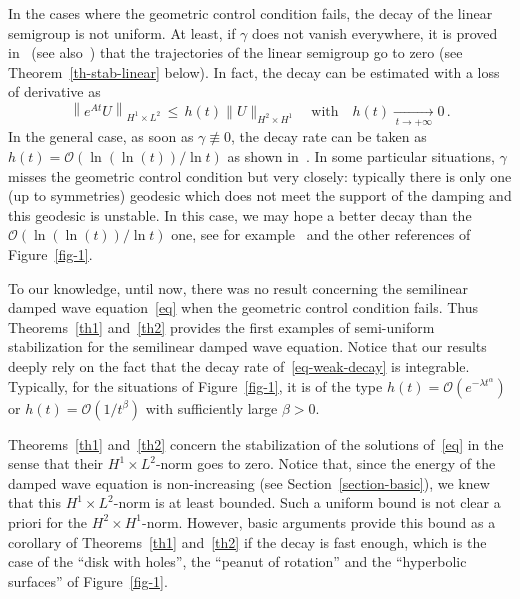 \documentclass[10pt]{amsart}
\theoremstyle{definition}\newtheorem{defi}[theo]{Definition}\newtheorem{rema}[theo]{Remark}\newtheorem{exam}[theo]{Example}\newtheorem{exem}[theo]{Example}\newtheorem{nota}[theo]{Notation}
\newcommand{\Oc}{\mathcal{O}}
\begin{document}
In the cases where the geometric control condition fails, the decay of the linear semigroup is not uniform. At least, if $\gamma$ does not vanish everywhere, it is proved in~\cite{Dafermos} (see also~\cite{Haraux}) that the trajectories of the linear semigroup go to zero (see Theorem~\ref{th-stab-linear} below). In fact, the decay can be estimated with a loss of derivative as
\begin{equation}\label{eq-weak-decay}
\left\|e^{At}U\right\|_{H^1\times L^2}\,\leq\, h(t)
\|U\|_{H^2\times H^1}\quad\text{with}\quad h(t)\xrightarrow[\,t\rightarrow +\infty\,]{} 0\,.
\end{equation}
In the general case, as soon as $\gamma\not\equiv 0$, the decay rate can be taken as\linebreak$h(t)=\Oc(\ln(\ln(t))/\ln t)$ as shown in~\cite{Lebeau,Lebeau-Robbiano}. In some particular situations, $\gamma$ misses the geometric control condition but very closely: typically there is only one (up to symmetries) geodesic which does not meet the support of the damping and this geodesic is unstable. In this case, we may hope a better decay than the $\Oc(\ln(\ln(t))/\ln t)$ one, see for example~\cite{CSVW,Leautaud-Lerner} and the other references of Figure~\ref{fig-1}.

To our knowledge, until now, there was no result concerning the semilinear damped wave equation~\eqref{eq} when the geometric control condition fails. Thus Theorems~\ref{th1} and~\ref{th2} provides the first examples of semi-uniform stabilization for the semilinear damped wave equation. Notice that our results deeply rely on the fact that the decay rate of~\eqref{eq-weak-decay} is integrable. Typically, for the situations of Figure~\ref{fig-1}, it is of the type $h(t)=\Oc(e^{-\lambda t^\alpha})$ or $h(t)=\Oc(1/t^\beta)$ with sufficiently large $\beta>0$.


Theorems~\ref{th1} and~\ref{th2} concern the stabilization of the solutions of~\eqref{eq} in the sense that their $H^1\times L^2$-norm goes to zero. Notice that, since the energy of the damped wave equation is non-increasing (see Section~\ref{section-basic}), we knew that this $H^1\times L^2$-norm is at least bounded. Such a uniform bound is not clear a priori for the $H^2\times H^1$-norm. However, basic arguments provide this bound as a corollary of Theorems~\ref{th1} and~\ref{th2} if the decay is fast enough, which is the case of the ``disk with holes'', the ``peanut of rotation'' and the ``hyperbolic surfaces'' of Figure~\ref{fig-1}.
\end{document}
